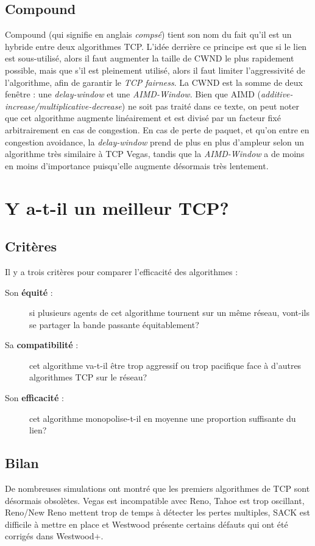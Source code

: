 \documentclass[	DIV=calc,%
							paper=a4,%
							fontsize=11pt,%
							twocolumn]{scrartcl}	 					%
\begin{document}
\subsection*{Compound}
Compound (qui signifie en anglais \textit{compsé}) tient son nom du fait qu'il est un hybride entre deux algorithmes TCP. L'idée derrière ce principe est que si le lien est sous-utilisé, alors il faut augmenter la taille de CWND le plus rapidement possible, mais que s'il est pleinement utilisé, alors il faut limiter l'aggressivité de l'algorithme, afin de garantir le \textit{TCP fairness}.
La CWND est la somme de deux fenêtre : une \textit{delay-window} et une \textit{AIMD-Window}. Bien que AIMD (\textit{additive-increase/multiplicative-decrease}) ne soit pas traité dans ce texte, on peut noter que cet algorithme augmente linéairement et est divisé par un facteur fixé arbitrairement en cas de congestion. En cas de perte de paquet, et qu'on entre en congestion avoidance, la \textit{delay-window} prend de plus en plus d'ampleur selon un algorithme très similaire à TCP Vegas, tandis que la \textit{AIMD-Window} a de moins en moins d'importance puisqu'elle augmente désormais très lentement.

\section*{Y a-t-il un meilleur TCP?}
\subsection*{Critères}
Il y a trois critères pour comparer l'efficacité des algorithmes :
\begin{description}
\item[Son \textbf{équité} :]{si plusieurs agents de cet algorithme tournent sur un même réseau, vont-ils se partager la bande passante équitablement?}
\item[Sa \textbf{compatibilité} :]{cet algorithme va-t-il être trop aggressif ou trop pacifique face à d'autres algorithmes TCP sur le réseau?}
\item[Son \textbf{efficacité} :]{cet algorithme monopolise-t-il en moyenne une proportion suffisante du lien?} 	
\end{description}
\subsection*{Bilan}
De nombreuses simulations ont montré que les premiers algorithmes de TCP sont désormais obsolètes. Vegas est incompatible avec Reno, Tahoe est trop oscillant, Reno/New Reno mettent trop de temps à détecter les pertes multiples, SACK est difficile à mettre en place et Westwood présente certains défauts qui ont été corrigés dans Westwood+.
\end{document}
